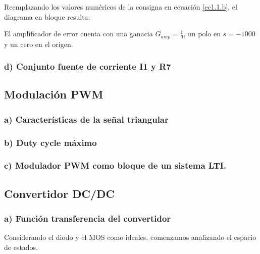 \documentclass[e4_tp2_main.tex]{subfiles}
\begin{document}
Reemplazando los valores num\'ericos de la consigna en ecuaci\'on \eqref{ec1.1.b}, el diagrama en bloque resulta: 

\begin{center}
\end{center}


El amplificador de error cuenta con una ganacia $G_{amp}=\frac{1}{9}$, un polo en $s=-1000$ y un cero en el origen.


\subsubsection*{d) Conjunto fuente de corriente I1 y R7}


\subsection{Modulaci\'on PWM}

\subsubsection*{a) Caracter\'isticas de la se\~nal triangular}
\subsubsection*{b) Duty cycle m\'aximo}
\subsubsection*{c) Modulador PWM como bloque de un sistema LTI.}



\subsection{Convertidor DC/DC}
\subsubsection*{a) Funci\'on transferencia del convertidor}

Considerando el diodo y el MOS como ideales, comenzamos analizando el espacio de estados. 
\end{document}
